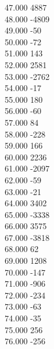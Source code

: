 { 47.000	4887 \\
 48.000	-4809 \\
 49.000	-50 \\
 50.000	-72 \\
 51.000	143 \\
 52.000	2581 \\
 53.000	-2762 \\
 54.000	-17 \\
 55.000	180 \\
 56.000	-60 \\
 57.000	84 \\
 58.000	-228 \\
 59.000	166 \\
 60.000	2236 \\
 61.000	-2097 \\
 62.000	-59 \\
 63.000	-21 \\
 64.000	3402 \\
 65.000	-3338 \\
 66.000	3575 \\
 67.000	-3818 \\
 68.000	62 \\
 69.000	1208 \\
 70.000	-147 \\
 71.000	-906 \\
 72.000	-234 \\
 73.000	-63 \\
 74.000	-35 \\
 75.000	256 \\
 76.000	-256 \\
}
